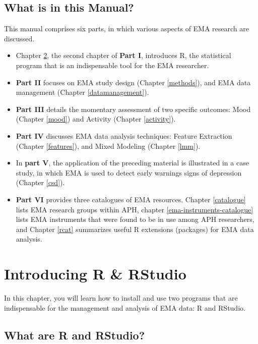 \documentclass[]{book}
\begin{document}
\section{What is in this Manual?}\label{what-is-in-this-manual}

This manual comprises six parts, in which various aspects of EMA
research are discussed.

\begin{itemize}
\item
  Chapter \ref{rstudio}, the second chapter of \textbf{Part I},
  introduces R, the statistical program that is an indispensable tool
  for the EMA researcher.
\item
  \textbf{Part II} focuses on EMA study design (Chapter \ref{methods}),
  and EMA data management (Chapter \ref{datamanagement}).
\item
  \textbf{Part III} details the momentary assessment of two specific
  outcomes: Mood (Chapter \ref{mood}) and Activity (Chapter
  \ref{activity}).
\item
  \textbf{Part IV} discusses EMA data analysis techniques: Feature
  Extraction (Chapter \ref{features}), and Mixed Modeling (Chapter
  \ref{lmm}).
\item
  In \textbf{part V}, the application of the preceding material is
  illustrated in a case study, in which EMA is used to detect early
  warnings signs of depression (Chapter \ref{csd}).
\item
  \textbf{Part VI} provides three catalogues of EMA resources. Chapter
  \ref{catalogue} lists EMA research groups within APH, chapter
  \ref{ema-instruments-catalogue} lists EMA instruments that were found
  to be in use among APH researchers, and Chapter \ref{rcat} summarizes
  useful R extensions (packages) for EMA data analysis.
\end{itemize}

\chapter{Introducing R \& RStudio}\label{rstudio}


In this chapter, you will learn how to install and use two programs that
are indispensable for the management and analysis of EMA data: R and
RStudio.

\section{What are R and RStudio?}\label{what-are-r-and-rstudio}
\end{document}

